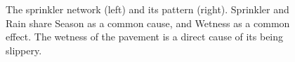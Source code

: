 \documentclass{elsarticle}%
\begin{document}
\begin{figure}[htbp]
\centering
{}
\caption{The sprinkler network (left) and its pattern (right). Sprinkler and Rain share Season as a common cause, and Wetness as a common effect. The wetness of the pavement is a direct cause of its being slippery.}%
\label{fig:sprinkler}%
\end{figure}
\end{document}
